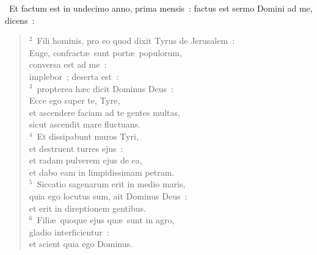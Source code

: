 ~Et factum est in undecimo anno, prima mensis~: factus est sermo Domini ad me, dicens~:
\begin{flushleft}\begin{verse}\vspace{6pt}${}^{2}$~Fili hominis, pro eo quod dixit Tyrus de Jerusalem~:\\ Euge, confract\ae\ sunt port\ae\ populorum,\\ conversa est ad me~:\\ implebor~; deserta est~:\\
${}^{3}$~propterea h\ae c dicit Dominus Deus~:\\ Ecce ego super te, Tyre,\\ et ascendere faciam ad te gentes multas,\\ sicut ascendit mare fluctuans.\\
${}^{4}$~Et dissipabunt muros Tyri,\\ et destruent turres ejus~:\\ et radam pulverem ejus de ea,\\ et dabo eam in limpidissimam petram.\\
${}^{5}$~Siccatio sagenarum erit in medio maris,\\ quia ego locutus sum, ait Dominus Deus~:\\ et erit in direptionem gentibus.\\
${}^{6}$~Fili\ae\ quoque ejus qu\ae\ sunt in agro,\\ gladio interficientur~:\\ et scient quia ego Dominus.\end{verse}\end{flushleft}


